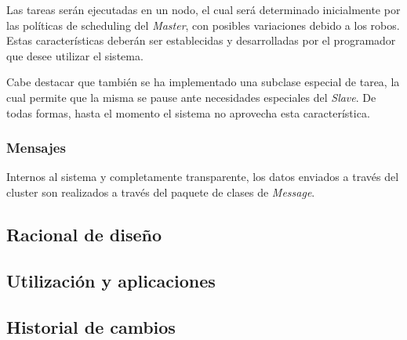 \documentclass[12pt,a4paper,oneside,spanish]{report}
\begin{document}

Las tareas serán ejecutadas en un nodo, el cual será determinado inicialmente por las políticas de scheduling del \textit{Master}, con posibles variaciones debido a los robos. Estas características deberán ser establecidas y desarrolladas por el programador que desee utilizar el sistema.



Cabe destacar que también se ha implementado una subclase especial de tarea, la cual permite que la misma se pause ante necesidades especiales del \textit{Slave}. De todas formas, hasta el momento el sistema no aprovecha esta característica.

\subsubsection*{Mensajes}

Internos al sistema y completamente transparente, los datos enviados a través del cluster son realizados a través del paquete de clases de \textit{Message}.

\subsection*{Racional de diseño}

\subsection*{Utilización y aplicaciones}

\subsection*{Historial de cambios}
\end{document}
